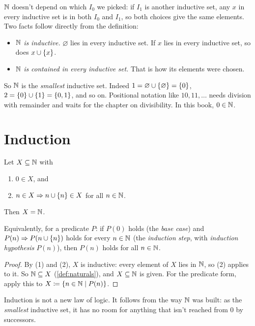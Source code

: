 $\mathbb{N}$ doesn't depend on which $I_0$ we picked: if $I_1$ is another inductive set,
any $x$ in every inductive set is in both $I_0$ and $I_1$, so both choices give
the same elements. Two facts follow directly from the definition:
\begin{itemize}
  \item \emph{$\mathbb{N}$ is inductive.} $\varnothing$ lies in every inductive set. If
    $x$ lies in every inductive set, so does $x \cup \lbrace x \rbrace$.
  \item \emph{$\mathbb{N}$ is contained in every inductive set.} That is how its elements
    were chosen.
\end{itemize}
So $\mathbb{N}$ is the \emph{smallest} inductive set. Indeed $1 = \varnothing \cup
\lbrace \varnothing \rbrace = \lbrace 0 \rbrace$, $2 = \lbrace 0 \rbrace \cup \lbrace 1 \rbrace = \lbrace 0, 1 \rbrace$, and so on.
Positional notation like $10, 11, \dots$ needs division with remainder and waits
for the chapter on divisibility. In this book, $0 \in \mathbb{N}$.

\section{Induction}

\begin{theorem}
\label{thm:induction}
Let $X \subseteq \mathbb{N}$ with
\begin{enumerate}
  \item $0 \in X$, and
  \item $n \in X \Rightarrow n \cup \lbrace n \rbrace \in X$ for all $n \in \mathbb{N}$.
\end{enumerate}
Then $X = \mathbb{N}$.

Equivalently, for a predicate $P$: if $P(0)$ holds (the \emph{base case}) and $P(n)
\Rightarrow P(n \cup \lbrace n \rbrace)$ holds for every $n \in \mathbb{N}$ (the \emph{induction
step}, with \emph{induction hypothesis} $P(n)$), then $P(n)$ holds for all $n \in
\mathbb{N}$.
\end{theorem}

\begin{proof}
By (1) and (2), $X$ is inductive: every element of $X$ lies in $\mathbb{N}$, so (2)
applies to it. So $\mathbb{N} \subseteq X$ (\cref{def:naturals}), and $X \subseteq \mathbb{N}$ is
given. For the predicate form, apply this to $X \coloneqq \lbrace n \in \mathbb{N} \mid P(n) \rbrace$.
\end{proof}

Induction is not a new law of logic. It follows from the way $\mathbb{N}$ was built: as
the \emph{smallest} inductive set, it has no room for anything that isn't reached
from $0$ by successors.

